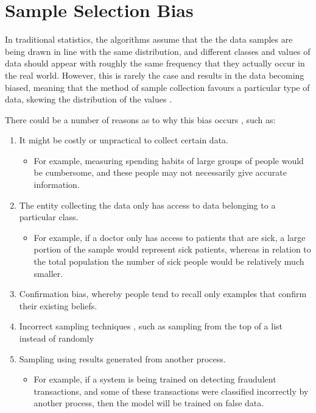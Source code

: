 \chapter[Sample Selection Bias]{Sample Selection Bias}

    In traditional statistics, the algorithms assume that the the data samples are being drawn in line with the same distribution, and different classes and values of data should appear with roughly the same frequency that they actually occur in the real world. However, this is rarely the case and results in the data becoming biased, meaning that the method of sample collection favours a particular type of data, skewing the distribution of the values \citep{CuddebackEtAl2004}.

    There could be a number of reasons as to why this bias occurs \citep{Tommasi2017}, such as:

    \begin{enumerate}
        \item It might be costly or unpractical to collect certain data.
        \begin{itemize}
        	\item For example, measuring spending habits of large groups of people would be cumbersome, and these people may not necessarily give accurate information.
        \end{itemize}
        \item The entity collecting the data only has access to data belonging to a particular class.
        \begin{itemize}
        	\item For example, if a doctor only has access to patients that are sick, a large portion of the sample would represent sick patients, whereas in relation to the total population the number of sick people would be relatively much smaller.
		\end{itemize}        
        \item Confirmation bias, whereby people tend to recall only examples that confirm their existing beliefs.
        \item Incorrect sampling techniques \citep{Marshall1996}, such as sampling from the top of a list instead of randomly
        \item Sampling using results generated from another process.
        \begin{itemize}
        	\item For example, if a system is being trained on detecting fraudulent transactions, and some of these transactions were classified incorrectly by another process, then the model will be trained on false data.   
   		\end{itemize}
    \end{enumerate} 
    
